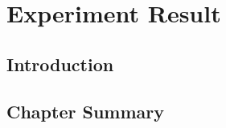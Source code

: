 
\chapter{Experiment Result}
\label{c:04_experiment}

\section{Introduction}



\section{Chapter Summary}








